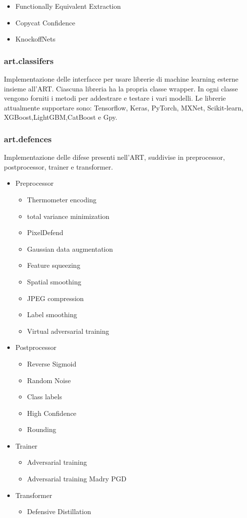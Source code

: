\begin{itemize}
    \item Functionally Equivalent Extraction
    \item Copycat Confidence
    \item KnockoffNets
\end{itemize}
\subsubsection{art.classifers}
Implementazione delle interfacce per usare librerie di machine learning esterne insieme all'ART. Ciascuna libreria ha la propria classe wrapper.
In ogni classe vengono forniti i metodi per addestrare e testare i vari modelli. Le librerie attualmente supportare sono: Tensorflow, Keras, PyTorch, MXNet, Scikit-learn,
XGBoost,LightGBM,CatBoost e Gpy.
\subsubsection{art.defences}
Implementazione delle difese presenti nell'ART, suddivise in preprocessor, postprocessor, trainer e transformer.

\begin{itemize}
    \item Preprocessor \begin{itemize}
        \item Thermometer encoding
        \item total variance minimization
        \item PixelDefend
        \item Gaussian data augmentation
        \item Feature squeezing
        \item Spatial smoothing
        \item JPEG compression
        \item Label smoothing
        \item Virtual adversarial training
    \end{itemize}
    \item Postprocessor \begin{itemize}
        \item Reverse Sigmoid
        \item Random Noise 
        \item Class labels
        \item High Confidence
        \item Rounding
    \end{itemize}
    \item Trainer \begin{itemize}
        \item Adversarial training
        \item Adversarial training Madry PGD
    \end{itemize}
    \item Transformer \begin{itemize}
        \item Defensive Distillation
    \end{itemize}
\end{itemize}
